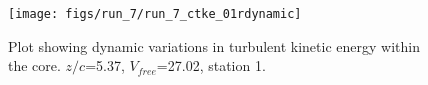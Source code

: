 \begin{figure}[H]
\centering
\texttt{[image: figs/run\_7/run\_7\_ctke\_01rdynamic]}
\caption{Plot showing dynamic variations in turbulent kinetic energy within the core. $z/c$=5.37, $V_{free}$=27.02, station 1.}
\label{fig:run_7_ctke_01rdynamic}
\end{figure}


